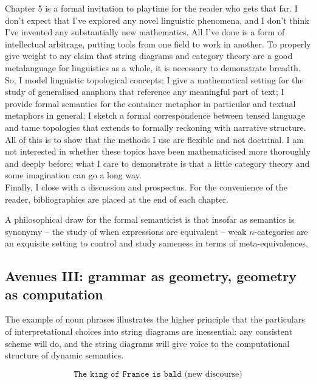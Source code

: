 Chapter 5 is a formal invitation to playtime for the reader who gets that far. I don't expect that I've explored any novel linguistic phenomena, and I don't think I've invented any substantially new mathematics. All I've done is a form of intellectual arbitrage, putting tools from one field to work in another. To properly give weight to my claim that string diagrams and category theory are a good metalanguage for linguistics as a whole, it is necessary to demonstrate breadth. So, I model linguistic topological concepts; I give a mathematical setting for the study of generalised anaphora that reference any meaningful part of text; I provide formal semantics for the container metaphor in particular and textual metaphors in general; I sketch a formal correspondence between tensed language and tame topologies that extends to formally reckoning with narrative structure. All of this is to show that the methods I use are flexible and not doctrinal. I am not interested in whether these topics have been mathematicised more thoroughly and deeply before; what I care to demonstrate is that a little category theory and some imagination can go a long way.\\

Finally, I close with a discussion and prospectus. For the convenience of the reader, bibliographies are placed at the end of each chapter. 





A philosophical draw for the formal semanticist is that insofar as semantics is synonymy -- the study of when expressions are equivalent -- weak $n$-categories are an exquisite setting to control and study sameness in terms of meta-equivalences. 


\subsection{Avenues III: grammar as geometry, geometry as computation}

The example of noun phrases illustrates the higher principle that the particulars of interpretational choices into string diagrams are inessential: any consistent scheme will do, and the string diagrams will give voice to the computational structure of dynamic semantics.

\begin{example}
\[\texttt{The king of France is bald} \text{ (new discourse)}\]
\end{example}


